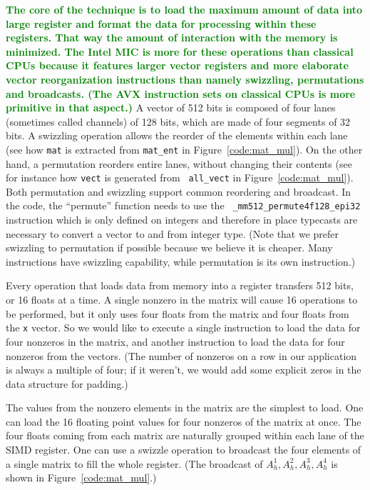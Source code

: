 \documentclass{sig-alternate}
\def\green#1{\textbf{\textcolor{green}{#1}}}
\def\ee#1{{\green{#1}}}
\begin{document}
\ee{The core of the technique is to load the maximum amount of data
  into large register and format the data for processing within these
  registers. That way the amount of interaction with the memory is
  minimized. The Intel MIC is more for these operations than classical
  CPUs because it features larger vector registers and more elaborate
  vector reorganization instructions than namely swizzling,
  permutations and broadcasts. (The AVX instruction sets on classical
  CPUs is more primitive in that aspect.)} A vector of 512 bits is
composed of four lanes (sometimes called channels) of 128 bits, which
are made of four segments of 32 bits. A swizzling operation allows the
reorder of the elements within each lane (see how {\tt mat} is
extracted from {\tt mat\_ent} in Figure~\ref{code:mat_mul}). On the
other hand, a permutation reorders entire lanes, without changing
their contents (see for instance how {\tt vect} is generated from {\tt
  all\_vect} in Figure~\ref{code:mat_mul}).  Both permutation and
swizzling support common reordering and broadcast. In the code, the
``permute'' function needs to use the {\tt
  \_mm512\_permute4f128\_epi32} instruction which is only defined on
integers and therefore in place typecasts are necessary to convert a
vector to and from integer type.  (Note that we prefer swizzling to
permutation if possible because we believe it is cheaper. Many
instructions have swizzling capability, while permutation is its own
instruction.)

Every operation that loads data from memory into a register
transfers 512 bits, or 16 floats at a time. A single nonzero
in the matrix will cause 16 operations to be performed, but it only
uses four floats from the matrix and four floats from the {\tt x} vector. So
we would like to execute a single instruction to load the data for four 
nonzeros in the matrix, and another instruction to load the data for
four nonzeros from the vectors.  
(The number of nonzeros on a row in our application is
always a multiple of four; if it weren't, we would add some explicit
zeros in the data structure for padding.)

The values from the nonzero elements in the matrix are the simplest to
load. One can load the 16 floating point values for four nonzeros of
the matrix at once. The four floats coming from each matrix are
naturally grouped within each lane of the SIMD register. One can use a
swizzle operation to broadcast the four elements of a single matrix to
fill the whole register. (The broadcast of $A_h^1,A_h^2,A_h^3,A_h^4$ is
shown in Figure~\ref{code:mat_mul}.)
\end{document}
